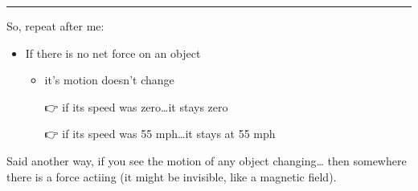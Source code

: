 \documentclass[
  letterpaper,
  DIV=11,
  numbers=noendperiod,
  oneside]{scrreprt}
\begin{document}
{
\makeatletter
\def\LT@makecaption#1#2#3{%
  \noalign{\smash{\hbox{\kern\textwidth\rlap{\kern\marginparsep
  \parbox[t]{\marginparwidth}{%
    \footnotesize{%
      \vspace{(1.1\baselineskip)}
    #1{#2: }\ignorespaces #3}}}}}}%
    }
\makeatother

\begin{figure}[H]



\end{figure}%

}

\begin{center}\rule{0.5\linewidth}{0.5pt}\end{center}

So, repeat after me:

\begin{itemize}
\item
  If there is no net force on an object

  \begin{itemize}
  \item
    it's motion doesn't change

    👉 if its speed was zero\ldots it stays zero

    👉 if its speed was 55 mph\ldots it stays at 55 mph
  \end{itemize}
\end{itemize}

Said another way, if you see the motion of any object changing\ldots{}
then somewhere there is a force actiing (it might be invisible, like a
magnetic field).
\end{document}

